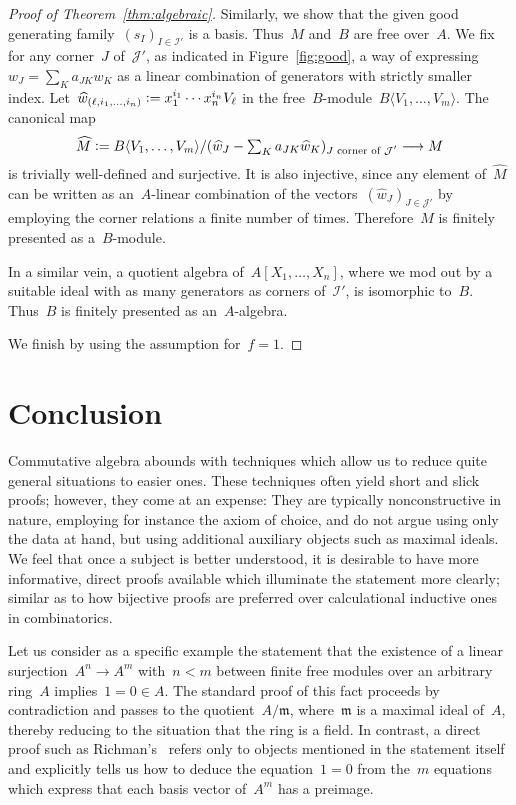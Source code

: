 \documentclass[oneside]{amsart}
\theoremstyle{definition}
\theoremstyle{plain}
\theoremstyle{remark}
\newcommand{\mmm}{\mathfrak{m}}
\newcommand{\I}{\mathcal{I}}
\newcommand{\J}{\mathcal{J}}
\newcommand{\defeq}{\vcentcolon=}
\begin{document}
\begin{proof}[Proof of Theorem~\ref{thm:algebraic}]
Similarly, we show that the given good generating family~$(s_I)_{I \in \I'}$ is
a basis. Thus~$M$ and~$B$ are free over~$A$. We fix for any corner~$J$
of~$\J'$, as indicated in Figure~\ref{fig:good},
a way of expressing~$w_J = \sum_K a_{JK} w_K$ as a linear combination of
generators with strictly smaller index. Let~$\widehat w_{(\ell,i_1,\ldots,i_n)}
\defeq x_1^{i_1} \cdots x_n^{i_n} V_\ell$ in the free~$B$-module~$B\langle
V_1,\ldots, V_m\rangle$. The canonical map
\[ \widehat M \defeq B\langle V_1,\ldots, V_m\rangle/
  (\widehat w_J - \textstyle\sum_K a_{JK} \widehat w_K)_{\text{$J$ corner of~$\J'$}} \longrightarrow M
\]
is trivially well-defined and surjective. It is also injective, since any
element of~$\widehat M$ can be written as an~$A$-linear combination of the
vectors~$(\widehat w_J)_{J \in \J'}$ by employing the corner relations a finite
number of times.  Therefore~$M$ is finitely presented as a~$B$-module.

In a similar vein, a quotient algebra of~$A[X_1,\ldots,X_n]$, where
we mod out by a suitable ideal with as many generators as corners of~$\I'$, is
isomorphic to~$B$. Thus~$B$ is finitely presented as an~$A$-algebra.

We finish by using the assumption for~$f = 1$.
\end{proof}


\section{Conclusion}

Commutative algebra abounds with techniques which allow us to reduce quite
general situations to easier ones. These techniques often yield short and slick
proofs; however, they come at an expense: They are typically nonconstructive in
nature, employing for instance the axiom of choice, and do not argue using only
the data at hand, but using additional auxiliary objects such as maximal
ideals. We feel that once a subject is better understood, it is desirable to
have more informative, direct proofs available which illuminate the
statement more clearly; similar as to how bijective proofs are preferred over
calculational inductive ones in combinatorics.

Let us consider as a specific example the statement that the existence of a linear
surjection~$A^n \to A^m$ with~$n < m$ between finite free modules over an
arbitrary ring~$A$ implies~$1 = 0 \in A$. The standard proof of this fact proceeds
by contradiction and passes to the quotient~$A/\mmm$, where~$\mmm$ is a maximal
ideal of~$A$, thereby reducing to the situation that the ring is a field. In
contrast, a direct proof such as Richman's~\cite{richman:trivial-rings}
refers only to objects mentioned in the statement itself and
explicitly tells us how to deduce the equation~$1 = 0$ from the~$m$ equations
which express that each basis vector of~$A^m$ has a preimage.
\end{document}
